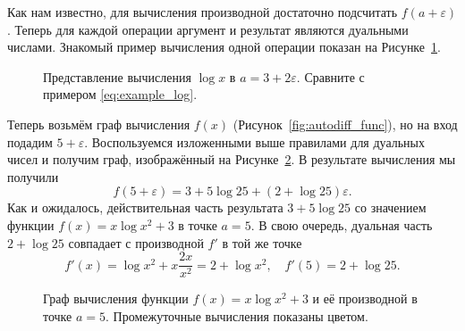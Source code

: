 \documentclass{article}
\newcommand{\dual}{\varepsilon}
\theoremstyle{definition}
\begin{document}
Как нам известно, для вычисления производной достаточно подсчитать $f(a + \dual)$. Теперь для каждой операции аргумент и результат являются дуальными числами. Знакомый пример вычисления одной операции показан на Рисунке~\ref{fig:graph_example}.
\begin{figure}
  \centering
  \caption{Представление вычисления $\log{x}$ в $a = 3 + 2 \dual$. Сравните с примером \eqref{eq:example_log}.}\label{fig:graph_example}
\end{figure}

Теперь возьмём граф вычисления $f(x)$ (Рисунок~\ref{fig:autodiff_func}), но на вход подадим $5 + \dual$. Воспользуемся изложенными выше правилами для дуальных чисел и получим граф, изображённый на Рисунке~\ref{fig:graph}. В результате вычисления мы получили
\[
  f(5 + \dual) = 3 + 5 \log{25} + (2 + \log{25})\dual
.\]
Как и ожидалось, действительная часть результата $3 + 5\log{25}$ со значением функции $f(x) = x\log{x^2} + 3$ в точке $a = 5$. В свою очередь, дуальная часть $2 + \log{25}$ совпадает с производной $f'$ в той же точке
\[
  f'(x) = \log{x^2} + x \frac{2 x}{x^2} = 2 + \log{x^2}, \quad f'(5) = 2 + \log{25}
.\]

\begin{figure}
\centering
{}
\caption{Граф вычисления функции $f(x) = x \log{x^2} + 3$ и её производной в точке $a = 5$. Промежуточные вычисления показаны цветом.}\label{fig:graph}
\end{figure}
\end{document}
